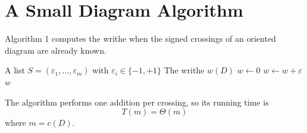 \section{A Small Diagram Algorithm}

Algorithm 1 computes the writhe when the signed crossings of an oriented diagram are already known.

\begin{algorithm}[H]
    \caption{Compute the writhe of a knot diagram}
    \label{alg:encoding}
    \begin{algorithmic}[1]
        \Require A list $S=(\varepsilon_1, \ldots , \varepsilon_m)$ with $\varepsilon_i \in \{-1, +1\}$
        \Ensure The writhe $w(D)$
        \State $w\gets 0$
            \State $w \gets w+\varepsilon$
        \EndFor
        \State \Return $w$
    \end{algorithmic}
\end{algorithm}

The algorithm performs one addition per crossing, so
its running time is
\begin{equation}
    T(m) = \Theta(m)
\end{equation}
where $m=c(D)$.

